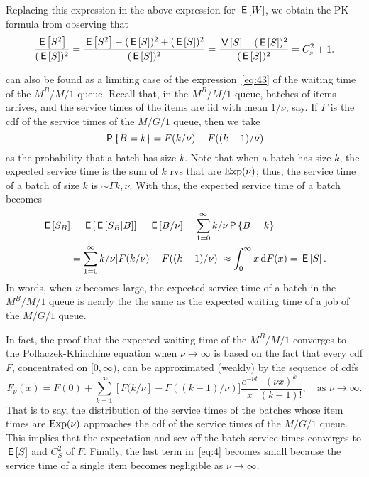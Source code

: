 \documentclass[stochastic-or.tex]{subfiles}
\begin{document}
Replacing this expression in the above expression for $\E\W$, we obtain the PK formula from observing that
\begin{equation*}
\frac{\E{S^2}}{(\E S)^2} =  \frac{\E{S^2} - (\E S)^{2} + (\E{S})^{2}}{(\E S)^2} = \frac{\V S + (\E S)^{2}}{(\E S)^{2}} = C_s^2 +1.
\end{equation*}


 can also be found as a limiting case of the expression~\cref{eq:43} of the waiting time of the $M^{B}/M/1$ queue.
Recall that, in the $M^{B}/M/1$ queue, batches of items arrives, and the service times of the items are iid with mean $1/\nu$, say. If $F$ is the cdf of the service times of the $M/G/1$ queue, then we take
\begin{equation*}
\P{B=k} = F(k/\nu) - F((k-1)/\nu)
\end{equation*}
as the probability that a batch has size $k$.
Note that when a batch has size $k$, the  expected service time is the sum of $k$ rvs that are $\Exp{\nu}$; thus, the service time of a batch of size $k$ is $\sim \Gamma{k, \nu}$.
With this, the expected service time of a batch becomes
\begin{align*}
  \E{S_{B}}
  &= \E{\E{S_{B}|B}} = \E{B/\nu} = \sum_{1=0}^{\infty} k/\nu \P{B=k} \\
&= \sum_{1=0}^{\infty} k/\nu  [F(k/\nu) - F((k-1)/\nu)] \approx \int_{0}^{\infty} x \d F(x) = \E S.
\end{align*}
In words, when $\nu$ becomes large, the expected service time of a batch in the $M^{B}/M/1$ queue is nearly the the same as the expected waiting time of a job of the $M/G/1$ queue.

In fact, the proof that the expected waiting time of the $M^{B}/M/1$ converges to the Pollaczek-Khinchine equation when $\nu\to \infty$ is based on the fact that every cdf $F$, concentrated on $[0, \infty)$, can be approximated (weakly) by the sequence of cdfs
\begin{equation*}
F_{\nu}(x) = F(0) + \sum_{k=1}^{\infty} [F(k/\nu] - F((k-1)/\nu)] \frac{e^{-\nu t}}{x} \frac{(\nu x)^k}{(k-1)!},\quad\text{as } \nu\to\infty.
\end{equation*}
That is to say, the distribution of the service times of the batches whose item times are $\Exp{\nu}$ approaches the cdf of the service times of the $M/G/1$ queue.
This implies that the expectation and scv off the batch service times converges to $\E S$ and $C_{S}^{2}$ of $F$.
Finally, the last term in~\cref{eq:4} becomes small because the service time of a single item becomes negligible as $\nu\to\infty$.
\end{document}
